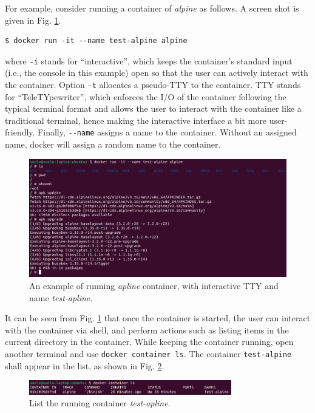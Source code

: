 For example, consider running a container of \textit{alpine} as follows. A screen shot is given in Fig. \ref{ch:vac:fig:dockerrunexp}.
\begin{lstlisting}
$ docker run -it --name test-alpine alpine
\end{lstlisting}
where \verb|-i| stands for ``interactive'', which keeps the container's standard input (i.e., the console in this example) open so that the user can actively interact with the container. Option \verb|-t| allocates a pseudo-TTY to the container. TTY stands for ``TeleTYpewriter'', which enforces the I/O of the container following the typical terminal format and allows the user to interact with the container like a traditional terminal, hence making the interactive interface a bit more user-friendly. Finally, \verb|--name| assigns a name to the container. Without an assigned name, docker will assign a random name to the container.
\begin{figure}
	\centering
	\includegraphics[width=350pt]{chapters/ch-virtualization-and-containerization/figures/dockerrunexp.png}
	\caption{An example of running \textit{apline} container, with interactive TTY and name \textit{test-apline}.} \label{ch:vac:fig:dockerrunexp}
\end{figure}

It can be seen from Fig. \ref{ch:vac:fig:dockerrunexp} that once the container is started, the user can interact with the container via shell, and perform actions such as listing items in the current directory in the container. While keeping the container running, open another terminal and use \verb|docker container ls|. The container \verb|test-alpine| shall appear in the list, as shown in Fig. \ref{ch:vac:fig:dockerrunexppart2}.
\begin{figure}
	\centering
	\includegraphics[width=250pt]{chapters/ch-virtualization-and-containerization/figures/dockerrunexppart2.png}
	\caption{List the running container \textit{test-apline}.} \label{ch:vac:fig:dockerrunexppart2}
\end{figure}

